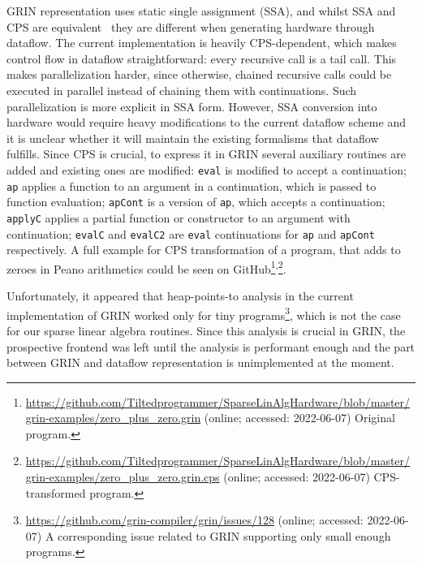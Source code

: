 GRIN representation uses static single assignment (SSA), and whilst SSA and CPS are equivalent~\cite{ssacps} they are different when generating hardware through dataflow. The current implementation is heavily CPS-depend\-ent, which makes control flow in dataflow straightforward: every recursive call is a tail call. This makes parallelization harder, since otherwise, chained recursive calls could be executed in parallel instead of chaining them with continuations. Such parallelization is more explicit in SSA form. However, SSA conversion into hardware would require heavy modifications to the current dataflow scheme and it is unclear whether it will maintain the existing formalisms that dataflow fulfills. Since CPS is crucial, to express it in GRIN several auxiliary routines are added and existing ones are modified: \texttt{eval} is modified to accept a continuation; \texttt{ap} applies a function to an argument in a continuation, which is passed to function evaluation; \texttt{apCont} is a version of \texttt{ap}, which accepts a continuation; \texttt{applyC} applies a partial function or constructor to an argument with continuation; \texttt{evalC} and \texttt{evalC2} are \texttt{eval} continuations for \texttt{ap} and \texttt{apCont} respectively. A full example for CPS transformation of a program, that adds to zeroes in Peano arithmetics could be seen on GitHub\footnote{\url{https://github.com/Tiltedprogrammer/SparseLinAlgHardware/blob/master/grin-examples/zero_plus_zero.grin} (online; accessed:
2022-06-07) Original program.}\textsuperscript{,}\footnote{\url{https://github.com/Tiltedprogrammer/SparseLinAlgHardware/blob/master/grin-examples/zero_plus_zero.grin.cps} (online; accessed:
2022-06-07) CPS-transformed program.}. 

Unfortunately, it appeared that heap-points-to analysis in the current implementation of GRIN worked only for tiny programs\footnote{\url{https://github.com/grin-compiler/grin/issues/128}  (online; accessed:
2022-06-07) A corresponding issue related to GRIN supporting only small enough programs.}, which is not the case for our sparse linear algebra routines. Since this analysis is crucial in GRIN, the prospective frontend was left until the analysis is performant enough and the part between GRIN and dataflow representation is unimplemented at the moment. 